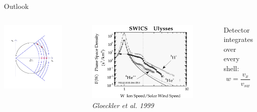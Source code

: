 \documentclass{beamer}
\begin{document}
\begin{frame}{Outlook}
	\begin{columns}
		\column{6cm}
		\flushleft
		\includegraphics[scale=0.9]{pictures/detektor22.pdf}
		\column{5cm}
		\begin{figure}
		\includegraphics[scale=0.18]{pictures/sw_pui_gloeckler.png}
		\caption{\tiny{\textit{Gloeckler et al. 1999}}}		
		\end{figure}
		Detector integrates over every shell:
		\[w = \frac{v_x}{v_{sw}}\]
	\end{columns}
\end{frame}
\end{document}
